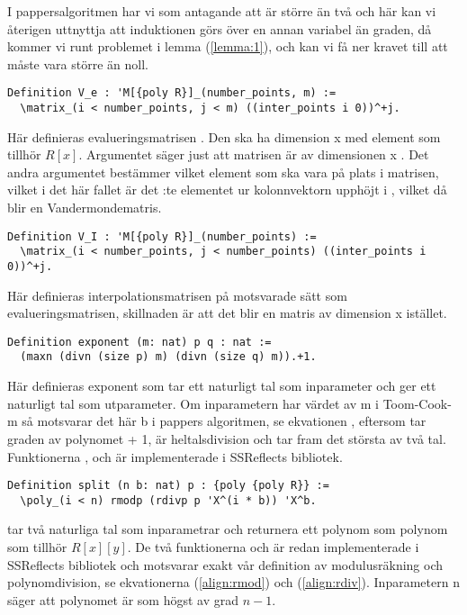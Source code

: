 I pappersalgoritmen har vi som antagande att  är större än två och här kan
vi återigen uttnyttja att induktionen görs över en annan variabel än graden, då
kommer vi runt problemet i lemma (\ref{lemma:1}), och kan vi få ner kravet till
att  måste vara större än noll.

\begin{lstlisting}
Definition V_e : 'M[{poly R}]_(number_points, m) :=
  \matrix_(i < number_points, j < m) ((inter_points i 0))^+j.
\end{lstlisting}

Här definieras evalueringsmatrisen . Den ska ha dimension
 x  med element som tillhör $R[x]$. Argumentet  säger just att matrisen är av dimensionen
 x . Det andra argumentet 
bestämmer vilket element som ska vara på plats  i matrisen, vilket i
det här fallet är det :te elementet ur kolonnvektorn 
upphöjt i , vilket då blir en Vandermondematris.

\begin{lstlisting}
Definition V_I : 'M[{poly R}]_(number_points) :=
  \matrix_(i < number_points, j < number_points) ((inter_points i 0))^+j.
\end{lstlisting}

Här definieras interpolationsmatrisen på motsvarade sätt som
evalueringsmatrisen, skillnaden är att det blir en matris av dimension
 x  istället.

\begin{lstlisting}
Definition exponent (m: nat) p q : nat :=
  (maxn (divn (size p) m) (divn (size q) m)).+1.
\end{lstlisting}

Här definieras exponent som tar ett naturligt tal  som inparameter och ger
ett naturligt tal som utparameter. Om inparametern har värdet av m i
Toom-Cook-m så motsvarar det här b i pappers algoritmen, se ekvationen ,
eftersom  tar graden av polynomet + 1,  är heltalsdivision och
 tar fram det största av två tal. Funktionerna ,  och
 är implementerade i SSReflects bibliotek.

\begin{lstlisting}
Definition split (n b: nat) p : {poly {poly R}} :=
  \poly_(i < n) rmodp (rdivp p 'X^(i * b)) 'X^b.
\end{lstlisting}

 tar två naturliga tal som inparametrar och returnera ett polynom som
polynom som tillhör $R[x][y]$. De två funktionerna  och  är
redan implementerade i SSReflects bibliotek och motsvarar exakt vår definition
av modulusräkning och polynomdivision, se ekvationerna (\ref{align:rmod}) och
(\ref{align:rdiv}). Inparametern n säger att polynomet är som högst av grad
$n-1$.

